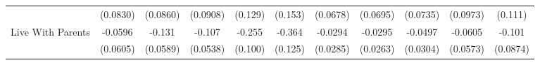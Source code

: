 {\begin{tabular}{l*{10}{c}}
            &    (0.0830)         &    (0.0860)         &    (0.0908)         &     (0.129)         &     (0.153)         &    (0.0678)         &    (0.0695)         &    (0.0735)         &    (0.0973)         &     (0.111)         \\
\addlinespace
Live With Parents&     -0.0596         &      -0.131\sym{*}  &      -0.107\sym{*}  &      -0.255\sym{*}  &      -0.364\sym{**} &     -0.0294         &     -0.0295         &     -0.0497         &     -0.0605         &      -0.101         \\
            &    (0.0605)         &    (0.0589)         &    (0.0538)         &     (0.100)         &     (0.125)         &    (0.0285)         &    (0.0263)         &    (0.0304)         &    (0.0573)         &    (0.0874)         \\
\bottomrule
\end{tabular}
}
